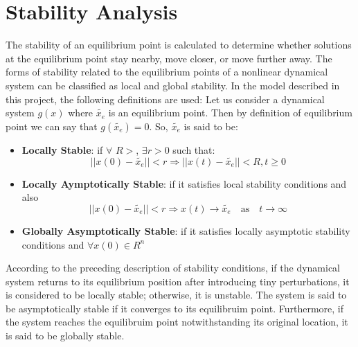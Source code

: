 \documentclass[12pt,a4wide]{report}
\numberwithin{equation}{chapter}
\numberwithin{theorem}{chapter}
\begin{document}
\section{Stability Analysis}
The stability of an equilibrium point is calculated to determine whether solutions at the equilibrium point stay nearby, move closer, or move further away. The forms of stability related to the equilibrium points of a nonlinear dynamical system can be classified as local and global stability. In the model described in this project, the following definitions are used:
Let us consider a dynamical system $g(x)$ where $\tilde{x_e}$ is an equilibrium point. Then by definition of equilibrium point we can say that $g(\tilde{x_e})=0$. So, $\tilde{x_e}$ is said to be:
\begin{itemize}
	\item \textbf{Locally Stable}: if $\forall$ $R > $, $\exists r > 0$ such that:\\
	\begin{equation*}
	||x(0) - \tilde{x_e} || < r \Rightarrow ||x(t) - \tilde{x_e} || < R, t \geq 0
		\end{equation*}
\vspace{-1.5cm}
\item \textbf{Locally Aymptotically Stable}: if it satisfies local stability conditions and also
\begin{equation*}
||x(0) - \tilde{x_e} || < r \Rightarrow x(t) \rightarrow \tilde{x_e} \quad \text{as} \quad t \rightarrow \infty
\end{equation*}
\item \textbf{Globally Asymptotically Stable}: if it satisfies locally asymptotic stability conditions and $\forall x(0) \in R^n$
\end{itemize} 

According to the preceding description of stability conditions, if the dynamical system returns to its equilibrium position after introducing tiny perturbations, it is considered to be locally stable; otherwise, it is unstable.
The system is said to be asymptotically stable if it converges to its equilibruim point. Furthermore, if the system reaches the equilibruim point notwithstanding its original location, it is said to be globally stable.
\end{document}
